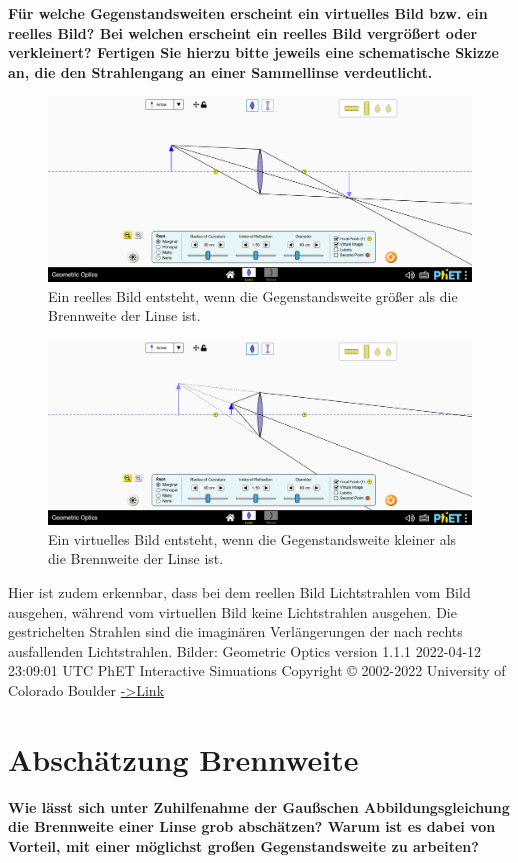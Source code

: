 \documentclass[a4paper, 12pt]{article}
\begin{document}
\textbf{Für welche Gegenstandsweiten erscheint ein virtuelles Bild bzw. ein reelles Bild? Bei welchen erscheint ein reelles Bild vergrößert oder verkleinert? 
Fertigen Sie hierzu bitte jeweils eine schematische Skizze an, die den Strahlengang an einer Sammellinse verdeutlicht.}
\begin{figure}[h]
\centering
	\includegraphics[scale=0.28]{A.png}
	\caption{Ein reelles Bild entsteht, wenn die Gegenstandsweite größer als die Brennweite der Linse ist.}
\end{figure}
\begin{figure}[h]
\centering
	\includegraphics[scale=0.28]{B.png}
	\caption{Ein virtuelles Bild entsteht, wenn die Gegenstandsweite kleiner als die Brennweite der Linse ist.}
\end{figure}

Hier ist zudem erkennbar, dass bei dem reellen Bild Lichtstrahlen vom Bild ausgehen, während vom virtuellen Bild keine Lichtstrahlen ausgehen. 
Die gestrichelten Strahlen sind die imaginären Verlängerungen der nach rechts ausfallenden Lichtstrahlen.
\tiny
Bilder: Geometric Optics version 1.1.1 2022-04-12 23:09:01 UTC PhET Interactive Simuations Copyright © 2002-2022 University of Colorado Boulder \href{https://phet.colorado.edu/sims/html/geometric-optics/latest/geometric-optics_en.html}{->Link}
\normalsize

\section{Abschätzung Brennweite}
\textbf{Wie lässt sich unter Zuhilfenahme der Gaußschen Abbildungsgleichung die Brennweite einer Linse grob abschätzen? Warum ist es dabei von Vorteil, mit einer möglichst großen Gegenstandsweite zu arbeiten?}
\end{document}
